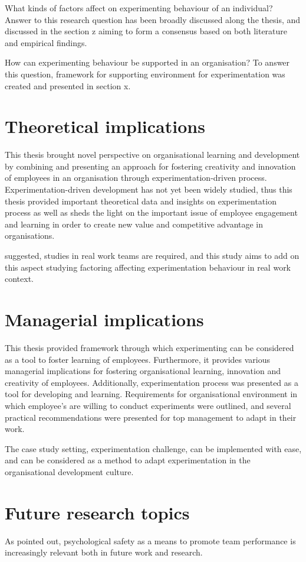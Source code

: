 What kinds of factors affect on experimenting behaviour of an individual?
Answer to this research question has been broadly discussed along the thesis, and discussed in the section z aiming to form a consensus based on both literature and empirical findings. 

How can experimenting behaviour be supported in an organisation? 
To answer this question, framework for supporting environment for experimentation was created and presented in section x. 

\section{Theoretical implications}
This thesis brought novel perspective on organisational learning and development by combining and presenting an approach for fostering creativity and innovation of employees in an organisation through experimentation-driven process. 
Experimentation-driven development has not yet been widely studied, thus this thesis provided important theoretical data and insights on experimentation process as well as sheds the light on the important issue of employee engagement and learning in order to create new value and competitive advantage in organisations. 

\citet{edmondson1999psychological} suggested, studies in real work teams are required, and this study aims to add on this aspect studying factoring affecting experimentation behaviour in real work context. 

\section{Managerial implications}
This thesis provided framework through which experimenting can be considered as a tool to foster learning of employees. Furthermore, it provides various managerial implications for fostering organisational learning, innovation and creativity of employees. Additionally, experimentation process was presented as a tool for developing and learning. Requirements for organisational environment in which employee's are willing to conduct experiments were outlined, and several practical recommendations were presented for top management to adapt in their work.

The case study setting, experimentation challenge, can be implemented with ease, and can be considered as a method to adapt experimentation in the organisational development culture. 

\section{Future research topics}
As \citet{edmondson1999psychological} pointed out, psychological safety as a means to promote team performance is increasingly relevant both in future work and research. 

